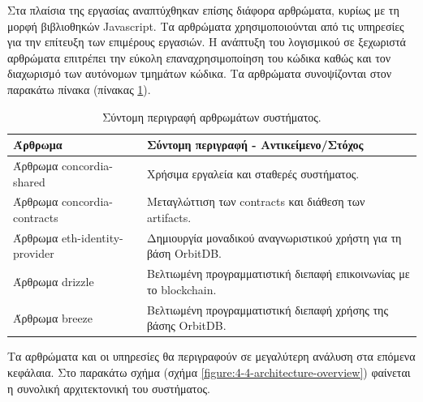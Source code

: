 Στα πλαίσια της εργασίας αναπτύχθηκαν επίσης διάφορα αρθρώματα, κυρίως με τη μορφή βιβλιοθηκών Javascript. Τα αρθρώματα χρησιμοποιούνται από τις υπηρεσίες για την επίτευξη των επιμέρους εργασιών. Η ανάπτυξη του λογισμικού σε ξεχωριστά αρθρώματα επιτρέπει την εύκολη επαναχρησιμοποίηση του κώδικα καθώς και τον διαχωρισμό των αυτόνομων τμημάτων κώδικα. Τα αρθρώματα συνοψίζονται στον παρακάτω πίνακα (πίνακας \ref{table:4-4-software-units-summary}).

\begin{table}[H]
    \begin{center}
        \begin{tabularx}{\textwidth}{l X}
            \toprule
            \textbf{Άρθρωμα} & \textbf{Σύντομη περιγραφή - Αντικείμενο/Στόχος} \\
            \midrule
            Άρθρωμα concordia-shared      & Χρήσιμα εργαλεία και σταθερές συστήματος. \\ [0.5ex]
            Άρθρωμα concordia-contracts   & Μεταγλώττιση των contracts και διάθεση των artifacts. \\ [0.5ex]
            Άρθρωμα eth-identity-provider & Δημιουργία μοναδικού αναγνωριστικού χρήστη για τη βάση OrbitDB. \\ [0.5ex]
            Άρθρωμα drizzle               & Βελτιωμένη προγραμματιστική διεπαφή επικοινωνίας με το blockchain. \\ [0.5ex]
            Άρθρωμα breeze                & Βελτιωμένη προγραμματιστική διεπαφή χρήσης της βάσης OrbitDB. \\ [0.5ex]
            \bottomrule
        \end{tabularx}
    \end{center}
    \caption{Σύντομη περιγραφή αρθρωμάτων συστήματος.}
    \label{table:4-4-software-units-summary}
\end{table}

Τα αρθρώματα και οι υπηρεσίες θα περιγραφούν σε μεγαλύτερη ανάλυση στα επόμενα κεφάλαια. Στο παρακάτω σχήμα (σχήμα \ref{figure:4-4-architecture-overview}) φαίνεται η συνολική αρχιτεκτονική του συστήματος.

